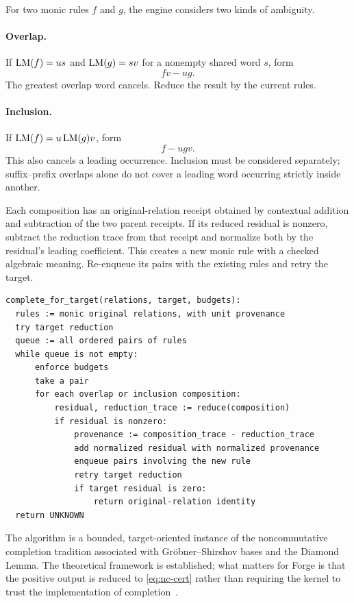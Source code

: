 For two monic rules \(f\) and \(g\), the engine considers two kinds of ambiguity.

\paragraph{Overlap.} If \(\operatorname{LM}(f)=us\) and \(\operatorname{LM}(g)=sv\) for a nonempty shared word \(s\), form
\[
 fv-ug.
\]
The greatest overlap word cancels. Reduce the result by the current rules.

\paragraph{Inclusion.} If \(\operatorname{LM}(f)=u\operatorname{LM}(g)v\), form
\[
 f-ugv.
\]
This also cancels a leading occurrence. Inclusion must be considered separately; suffix--prefix overlaps alone do not cover a leading word occurring strictly inside another.

Each composition has an original-relation receipt obtained by contextual addition and subtraction of the two parent receipts. If its reduced residual is nonzero, subtract the reduction trace from that receipt and normalize both by the residual's leading coefficient. This creates a new monic rule with a checked algebraic meaning. Re-enqueue its pairs with the existing rules and retry the target.

\par\noindent\begin{minipage}{\linewidth}
\begin{lstlisting}
complete_for_target(relations, target, budgets):
  rules := monic original relations, with unit provenance
  try target reduction
  queue := all ordered pairs of rules
  while queue is not empty:
      enforce budgets
      take a pair
      for each overlap or inclusion composition:
          residual, reduction_trace := reduce(composition)
          if residual is nonzero:
              provenance := composition_trace - reduction_trace
              add normalized residual with normalized provenance
              enqueue pairs involving the new rule
              retry target reduction
              if target residual is zero:
                  return original-relation identity
  return UNKNOWN
\end{lstlisting}
\end{minipage}\par

The algorithm is a bounded, target-oriented instance of the noncommutative completion tradition associated with Gr\"obner--Shirshov bases and the Diamond Lemma. The theoretical framework is established; what matters for Forge is that the positive output is reduced to \eqref{eq:nc-cert} rather than requiring the kernel to trust the implementation of completion~\cite{bergman,gbnp}.

